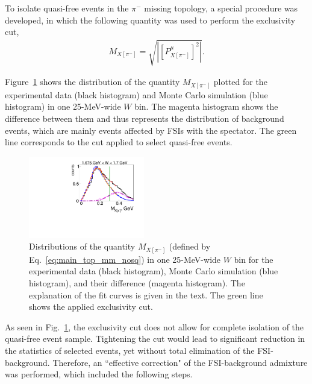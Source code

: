 \documentclass[prc,twocolumn,superscriptaddress,showpacs,amssymb,amsmath,amsfonts,aps,nofootinbib]{revtex4-1}
\begin{document}
To isolate quasi-free events in the $\pi^{-}$ missing topology, a special procedure was developed, in which the following quantity was used to perform the exclusivity cut,
\begin{equation}
\begin{aligned}
 M_{X[\pi^{-}]}=\sqrt{|[P_{X[\pi^{-}]}^{\mu}]^{2}|}.
\end{aligned}\label{eq:main_top_mm_nosq}
\end{equation}


Figure~\ref{fig:pim_miss_top_cut} shows the distribution of the quantity $M_{X[\pi^{-}]}$ plotted for the experimental data (black histogram) and Monte Carlo simulation (blue histogram) in one 25-MeV-wide $W$ bin. The magenta histogram shows the difference between them and thus represents the distribution of background events, which are mainly events affected by FSIs with the spectator. The green line corresponds to the cut applied to select quasi-free events. %

\begin{figure}[htp]
\begin{center}
\includegraphics[width=0.45\textwidth,keepaspectratio]{pictures/event_selection/excl_cut_pim_miss2.pdf}
\caption{Distributions of the quantity $M_{X[\pi^{-}]}$ (defined by Eq.\!~\eqref{eq:main_top_mm_nosq}) in one 25-MeV-wide $W$ bin for the experimental data (black histogram), Monte Carlo simulation (blue histogram), and their difference (magenta histogram). The explanation of the fit curves is given in the text. The green line shows the applied exclusivity cut.}
\label{fig:pim_miss_top_cut}
\end{center}
\end{figure}



As seen in Fig.\!~\ref{fig:pim_miss_top_cut}, the exclusivity cut does not allow for complete isolation of the quasi-free event sample. Tightening the cut would lead to significant reduction in the statistics of selected events, yet without total elimination of the FSI-background. Therefore, an ``effective correction" of the FSI-background admixture was performed, which included the following steps.
\end{document}
